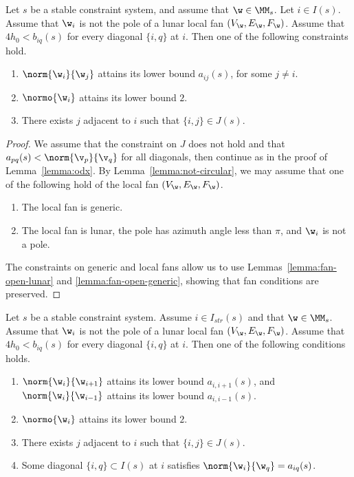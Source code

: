 \begin{lemma}\label{lemma:odx2} 
Let $s$ be a stable constraint system,
and assume that $\w\in \MM_s$.  Let $i\in I(s)$.
Assume  that $\w_i$ is not the pole of a lunar local fan $(V_\w,E_\w,F_\w)$.
Assume that $4h_0 < b_{iq}(s)$ for every diagonal $\{i,q\}$ at $i$.
Then one of the following   constraints hold.
\begin{enumerate}
\item $\norm{\w_i}{\w_j}$ attains its lower bound $a_{i j}(s)$, for
  some $j\ne i$.
\item $\normo{\w_i}$ attains its lower bound $2$.
\item There exists $j$ adjacent to $i$ such that $\{i,j\}\in J(s)$.
\end{enumerate}
\end{lemma}

\begin{proof} 
We assume that the constraint on $J$ does not hold and
that $a_{p q}(s)<\norm{\v_p}{\v_q}$ for all diagonals, then continue as in the proof of
Lemma~\ref{lemma:odx}.  
By Lemma~\ref{lemma:not-circular}, we may assume  
that one of the following hold of the local fan $(V_\w,E_\w,F_\w)$.
\begin{enumerate}
\item The local fan is generic.
\item The local fan is lunar, the pole has azimuth
angle less than $\pi$, and $\w_i$ is not a pole.  
\end{enumerate}
The constraints on generic and local fans
allow us to use Lemmas~\ref{lemma:fan-open-lunar} and
\ref{lemma:fan-open-generic}, showing that fan conditions are preserved.
\end{proof}

\begin{lemma}\label{lemma:imj2}
Let $s$ be a stable constraint system.  Assume $i\in I_{str}(s)$ and
that $\w\in \MM_s$.  
Assume  that $\w_i$ is not the pole of a lunar local fan $(V_\w,E_\w,F_\w)$.
Assume that $4h_0 < b_{iq}(s)$ for every diagonal $\{i,q\}$ at $i$.
Then one of the following conditions holds.
\begin{enumerate}
\item $\norm{\w_i}{\w_{i+1}}$ attains its lower bound $a_{i,i+1}(s)$, and
 $\norm{\w_i}{\w_{i-1}}$ attains its lower bound $a_{i,i-1}(s)$.
\item $\normo{\w_i}$ attains its lower bound $2$.
\item There exists $j$ adjacent to $i$ such that $\{i,j\}\in J(s)$.
\item Some diagonal $\{i,q\}\subset I(s)$ at $i$ satisfies
$\norm{\w_i}{\w_q}=a_{i q}(s)$.
\end{enumerate}
\end{lemma}


